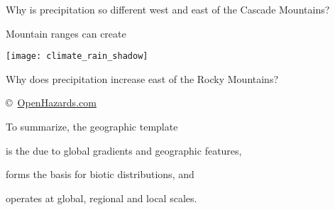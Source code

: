 {
\begin{frame}[t,plain]
\end{frame}
}

{
\begin{frame}[t,plain]{Why is precipitation so different west and east of the Cascade Mountains?}
\end{frame}
}


\begin{frame}[t,plain]{Mountain ranges can create }
	\begin{center}
		\texttt{[image: climate\_rain\_shadow]}
	\end{center}
\end{frame}

{
\begin{frame}[t,plain]{Why does precipitation increase east of the Rocky Mountains?}
\end{frame}
}

{
	\begin{frame}[t]
		
		\vfilll
		
		\hfill \tiny \copyright~\href{http://www.openhazards.com/blogs/wardsn/hurricane-wind-forecasting-1-what-and-how}{OpenHazards.com}
	\end{frame}
}

\begin{frame}[t,plain]{To summarize, the geographic template}

	\hangpara is the  due to global gradients and geographic features,
	
	\hangpara forms the basis for biotic distributions, and
	
	\hangpara operates at global, regional and local scales.
\end{frame}



